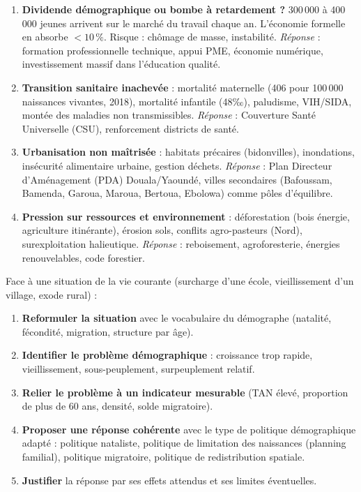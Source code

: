 \documentclass[11pt]{article}
\begin{document}
\begin{exemplebox}
\begin{enumerate}
\item \textbf{Dividende démographique ou bombe à retardement ?} 300\,000 à 400\,000 jeunes arrivent sur le marché du travail chaque an. L'économie formelle en absorbe $< 10\,\%$. Risque : chômage de masse, instabilité. \emph{Réponse} : formation professionnelle technique, appui PME, économie numérique, investissement massif dans l'éducation qualité.
\item \textbf{Transition sanitaire inachevée} : mortalité maternelle (406 pour 100\,000 naissances vivantes, 2018), mortalité infantile (48‰), paludisme, VIH/SIDA, montée des maladies non transmissibles. \emph{Réponse} : Couverture Santé Universelle (CSU), renforcement districts de santé.
\item \textbf{Urbanisation non maîtrisée} : habitats précaires (bidonvilles), inondations, insécurité alimentaire urbaine, gestion déchets. \emph{Réponse} : Plan Directeur d'Aménagement (PDA) Douala/Yaoundé, villes secondaires (Bafoussam, Bamenda, Garoua, Maroua, Bertoua, Ebolowa) comme pôles d'équilibre.
\item \textbf{Pression sur ressources et environnement} : déforestation (bois énergie, agriculture itinérante), érosion sols, conflits agro-pasteurs (Nord), surexploitation halieutique. \emph{Réponse} : reboisement, agroforesterie, énergies renouvelables, code forestier.
\end{enumerate}
\end{exemplebox}

\begin{methode}
Face à une situation de la vie courante (surcharge d'une école, vieillissement d'un village, exode rural) :
\begin{enumerate}
\item \textbf{Reformuler la situation} avec le vocabulaire du démographe (natalité, fécondité, migration, structure par âge).
\item \textbf{Identifier le problème démographique} : croissance trop rapide, vieillissement, sous-peuplement, surpeuplement relatif.
\item \textbf{Relier le problème à un indicateur mesurable} (TAN élevé, proportion de plus de 60 ans, densité, solde migratoire).
\item \textbf{Proposer une réponse cohérente} avec le type de politique démographique adapté : politique nataliste, politique de limitation des naissances (planning familial), politique migratoire, politique de redistribution spatiale.
\item \textbf{Justifier} la réponse par ses effets attendus et ses limites éventuelles.
\end{enumerate}
\end{methode}
\end{document}
